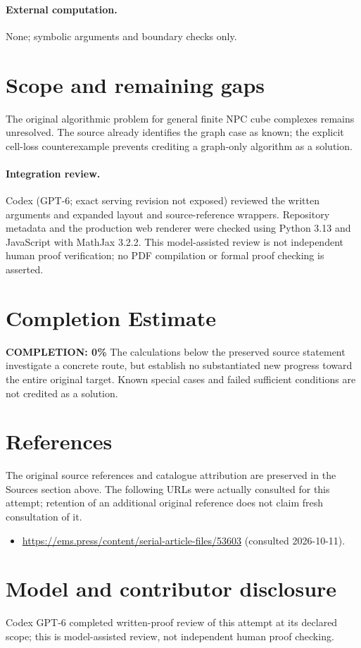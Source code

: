 \documentclass[11pt]{article}
\begin{document}
\paragraph{External computation.} None; symbolic arguments and boundary checks only.
\section{Scope and remaining gaps}
The original algorithmic problem for general finite NPC cube complexes remains unresolved. The source already identifies the graph case as known; the explicit cell-loss counterexample prevents crediting a graph-only algorithm as a solution.
\paragraph{Integration review.} Codex (GPT-6; exact serving revision not exposed) reviewed the written arguments and expanded layout and source-reference wrappers. Repository metadata and the production web renderer were checked using Python 3.13 and JavaScript with MathJax 3.2.2. This model-assisted review is not independent human proof verification; no PDF compilation or formal proof checking is asserted.

\section{Completion Estimate}
\noindent\textbf{COMPLETION: 0\%}
The calculations below the preserved source statement investigate a concrete route,
but establish no substantiated new progress toward the entire original target.
Known special cases and failed sufficient conditions are not credited as a solution.
\section{References}
The original source references and catalogue attribution are preserved in the
Sources section above. The following URLs were actually consulted for this attempt;
retention of an additional original reference does not claim fresh consultation of it.
\begin{itemize}
\item \url{https://ems.press/content/serial-article-files/53603} (consulted 2026-10-11). 
\end{itemize}
\section{Model and contributor disclosure}
Codex GPT-6 completed written-proof review of this attempt at its declared scope; this is model-assisted review, not independent human proof checking.
\end{document}
